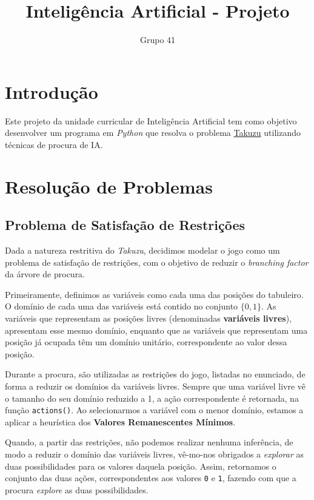 \documentclass[12pt]{article}
\title{Inteligência Artificial - Projeto}
\author{Grupo 41}
\date{}
\begin{document}
\maketitle


\section{Introdução}
Este projeto da unidade curricular de Inteligência Artificial tem como objetivo
desenvolver um programa em \emph{Python} que resolva o problema
\href{https://en.wikipedia.org/wiki/Takuzu}{Takuzu} utilizando técnicas de
procura de IA.

\section{Resolução de Problemas}
\subsection{Problema de Satisfação de Restrições}
Dada a natureza restritiva do \emph{Takuzu}, decidimos modelar o jogo como um
problema de satisfação de restrições, com o objetivo de reduzir o
\emph{branching factor} da árvore de procura.

Primeiramente, definimos as variáveis como cada uma das posições do tabuleiro.
O domínio de cada uma das variáveis está contido no conjunto $\{0, 1\}$.
As variáveis que representam as posições livres (denominadas
\textbf{variáveis livres}), apresentam esse mesmo domínio, enquanto que as
variáveis que representam uma posição já ocupada têm um domínio unitário,
correspondente ao valor dessa posição.

Durante a procura, são utilizadas as restrições do jogo, listadas no enunciado,
de forma a reduzir os domínios da variáveis livres. Sempre que uma variável
livre vê o tamanho do seu domínio reduzido a 1, a ação correspondente é retornada,
na função \texttt{actions()}. Ao selecionarmos a variável com o menor domínio,
estamos a aplicar a heurística dos \textbf{Valores Remanescentes Mínimos}.

Quando, a partir das restrições, não podemos realizar nenhuma inferência, de
modo a reduzir o domínio das variáveis livres, vê-mo-nos obrigados a \emph{explorar}
as duas possibilidades para os valores daquela posição. Assim, retornamos o
conjunto das duas ações, correspondentes aos valores \texttt{0} e \texttt{1},
fazendo com que a procura \emph{explore} as duas possibilidades.
\end{document}
